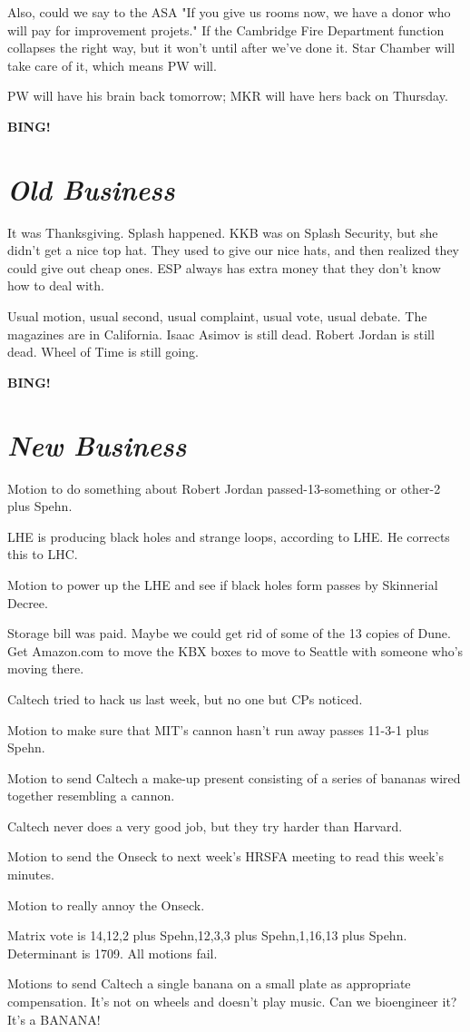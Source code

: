 \documentclass[10pt]{article}
\newcommand{\bing}{{\bf BING!} }
\newcommand{\goto}[1]{\bing \vskip 12pt \section*{{\em{#1}}}}
\newcommand{\ps}{ plus Spehn\xspace}
\begin{document}
Also, could we say to the ASA "If you give us rooms now, we have a donor who will pay for improvement projets."  If the Cambridge Fire Department function collapses the right way, but it won't until after we've done it.  Star Chamber will take care of it, which means PW will.

PW will have his brain back tomorrow; MKR will have hers back on Thursday.

\goto{Old Business}

It was Thanksgiving.  Splash happened.  KKB was on Splash Security, but she didn't get a nice top hat.  They used to give our nice hats, and then realized they could give out cheap ones.  ESP always has extra money that they don't know how to deal with.

Usual motion, usual second, usual complaint, usual vote, usual debate.  The magazines are in California.  Isaac Asimov is still dead.  Robert Jordan is still dead.  Wheel of Time is still going.


\goto{New Business}

Motion to do something about Robert Jordan passed-13-something or other-2\ps.

LHE is producing black holes and strange loops, according to LHE.  He corrects this to LHC.

Motion to power up the LHE and see if black holes form passes by Skinnerial Decree.

Storage bill was paid.  Maybe we could get rid of some of the 13 copies of Dune.  Get Amazon.com to move the KBX boxes to move to Seattle with someone who's moving there.

Caltech tried to hack us last week, but no one but CPs noticed.

Motion to make sure that MIT's cannon hasn't run away passes 11-3-1\ps.

Motion to send Caltech a make-up present consisting of a series of bananas wired together resembling a cannon.

Caltech never does a very good job, but they try harder than Harvard.

Motion to send the Onseck to next week's HRSFA meeting to read this week's minutes.

Motion to really annoy the Onseck.

Matrix vote is {{14,12,2\ps},{12,3,3\ps},{1,16,13\ps}}.  Determinant is 1709. All motions fail.

Motions to send Caltech a single banana on a small plate as appropriate compensation.  It's not on wheels and doesn't play music.  Can we bioengineer it?  It's a BANANA!
\end{document}
